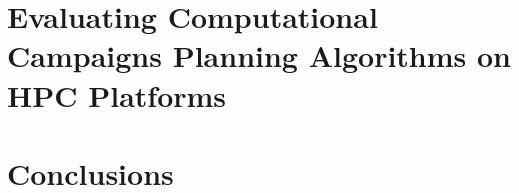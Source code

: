 \documentclass[final]{ruthesis}
\begin{document}
\chapter{Evaluating Computational Campaigns Planning Algorithms on HPC Platforms}

\label{ch:campaigns}

\chapter{Conclusions}

\label{ch:conclusions}



\end{document}
